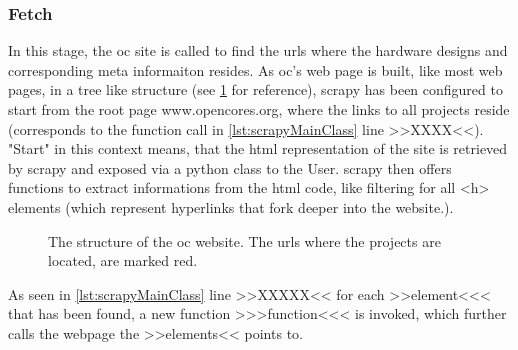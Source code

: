 \subsubsection{Fetch} 
In this stage, the \gls{oc} site is called to find the \glspl{url} where the hardware designs and corresponding meta informaiton resides. As \gls{oc}'s web page is built, like most web pages, in a tree like structure (see \cref{fig:opencoresStructure} for reference), \gls{scrapy} has been configured to start from the root page www.opencores.org, where the links to all projects reside (corresponds to the function call in \cref{lst:scrapyMainClass} line >>XXXX<<). "Start" in this context means, that the \Gls{html} representation of the site is retrieved by \gls{scrapy} and exposed via a \Gls{python} class to the User. \Gls{scrapy} then offers functions to extract informations from the \gls{html} code, like filtering for all <h> elements (which represent \glspl{hyperlink} that fork deeper into the website.).

\begin{figure}
 \centering
 \caption{The structure of the \gls{oc} website. The \Glspl{url} where the projects are located, are marked red.}
 \label{fig:opencoresStructure}
\end{figure}


As seen in \cref{lst:scrapyMainClass} line >>XXXXX<< for each >>element<<< that has been found, a new function >>>function<<< is invoked, which further calls the webpage the >>elements<< points to. 

